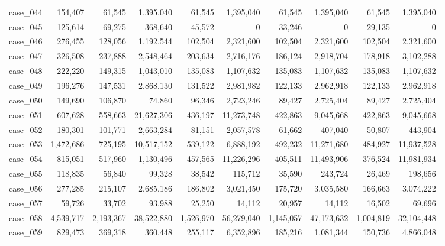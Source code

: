 \begin{footnotesize}
\begin{longtable}{l r rr rr rr rr}
case\_044 & 154{,}407 & 61{,}545 & 1{,}395{,}040 & 61{,}545 & 1{,}395{,}040 & 61{,}545 & 1{,}395{,}040 & 61{,}545 & 1{,}395{,}040 \\
case\_045 & 125{,}614 & 69{,}275 & 368{,}640 & 45{,}572 & 0 & 33{,}246 & 0 & 29{,}135 & 0 \\
case\_046 & 276{,}455 & 128{,}056 & 1{,}192{,}544 & 102{,}504 & 2{,}321{,}600 & 102{,}504 & 2{,}321{,}600 & 102{,}504 & 2{,}321{,}600 \\
case\_047 & 326{,}508 & 237{,}888 & 2{,}548{,}464 & 203{,}634 & 2{,}716{,}176 & 186{,}124 & 2{,}918{,}704 & 178{,}918 & 3{,}102{,}288 \\
case\_048 & 222{,}220 & 149{,}315 & 1{,}043{,}010 & 135{,}083 & 1{,}107{,}632 & 135{,}083 & 1{,}107{,}632 & 135{,}083 & 1{,}107{,}632 \\
case\_049 & 196{,}276 & 147{,}531 & 2{,}868{,}130 & 131{,}522 & 2{,}981{,}982 & 122{,}133 & 2{,}962{,}918 & 122{,}133 & 2{,}962{,}918 \\
case\_050 & 149{,}690 & 106{,}870 & 74{,}860 & 96{,}346 & 2{,}723{,}246 & 89{,}427 & 2{,}725{,}404 & 89{,}427 & 2{,}725{,}404 \\
case\_051 & 607{,}628 & 558{,}663 & 21{,}627{,}306 & 436{,}197 & 11{,}273{,}748 & 422{,}863 & 9{,}045{,}668 & 422{,}863 & 9{,}045{,}668 \\
case\_052 & 180{,}301 & 101{,}771 & 2{,}663{,}284 & 81{,}151 & 2{,}057{,}578 & 61{,}662 & 407{,}040 & 50{,}807 & 443{,}904 \\
case\_053 & 1{,}472{,}686 & 725{,}195 & 10{,}517{,}152 & 539{,}122 & 6{,}888{,}192 & 492{,}232 & 11{,}271{,}680 & 484{,}927 & 11{,}937{,}528 \\
case\_054 & 815{,}051 & 517{,}960 & 1{,}130{,}496 & 457{,}565 & 11{,}226{,}296 & 405{,}511 & 11{,}493{,}906 & 376{,}524 & 11{,}981{,}934 \\
case\_055 & 118{,}835 & 56{,}840 & 99{,}328 & 38{,}542 & 115{,}712 & 35{,}590 & 243{,}724 & 26{,}469 & 198{,}656 \\
case\_056 & 277{,}285 & 215{,}107 & 2{,}685{,}186 & 186{,}802 & 3{,}021{,}450 & 175{,}720 & 3{,}035{,}580 & 166{,}663 & 3{,}074{,}222 \\
case\_057 & 59{,}726 & 33{,}702 & 93{,}988 & 25{,}250 & 14{,}112 & 20{,}957 & 14{,}112 & 16{,}502 & 69{,}696 \\
case\_058 & 4{,}539{,}717 & 2{,}193{,}367 & 38{,}522{,}880 & 1{,}526{,}970 & 56{,}279{,}040 & 1{,}145{,}057 & 47{,}173{,}632 & 1{,}004{,}819 & 32{,}104{,}448 \\
case\_059 & 829{,}473 & 369{,}318 & 360{,}448 & 255{,}117 & 6{,}352{,}896 & 185{,}216 & 1{,}081{,}344 & 150{,}736 & 4{,}866{,}048 \\

\end{longtable}
\end{footnotesize}
